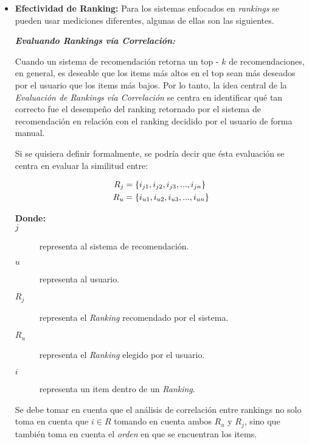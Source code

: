 \begin{itemize}
\begin{itemize}[label=$\diamond$]
            \item \textbf{Efectividad de Ranking: } Para los sistemas enfocados en \textit{rankings} se pueden usar mediciones diferentes, algunas de ellas son las siguientes.
            
            \textbf{\textit{Evaluando Rankings vía Correlación: }}

            Cuando un sistema de recomendación retorna un top - $k$ de recomendaciones, en general, es deseable que los items más altos en el top sean más deseados por el usuario que los items más bajos.
            Por lo tanto, la idea central de la \textit{Evaluación de Rankings vía Correlación} se centra en identificar qué tan correcto fue el desempeño del ranking retornado por el sistema de recomendación en relación con el ranking decidido por el usuario de forma manual.
            
            \newpage

            Si se quisiera definir formalmente, se podría decir que ésta evaluación se centra en evaluar la similitud entre:

            \begin{equation}
                \begin{split}
                    R_j &= \{ i_{j1}, i_{j2}, i_{j3}, ..., i_{jn} \}\\
                    R_u &= \{ i_{u1}, i_{u2}, i_{u3}, ..., i_{un} \}
                \end{split}
                \addequation{Definición de Rankings de Usuario y de Sistema}
            \end{equation}  

            \begin{description}
                \item[\textbf{Donde:}]
                \item[$j$] representa al sistema de recomendación.
                \item[$u$] representa al usuario.
                \item[$R_j$] representa el \textit{Ranking} recomendado por el sistema.
                \item[$R_u$] representa el \textit{Ranking} elegido por el usuario.
                \item[$i$]  representa un item dentro de un \textit{Ranking}.      
            \end{description}

            Se debe tomar en cuenta que el análisis de correlación entre rankings no solo toma en cuenta que $i \in R$ tomando en cuenta ambos $R_u$ y $R_j$, sino que también toma en cuenta el \textit{orden} en que se encuentran los items.
            

\end{itemize}
\end{itemize}
